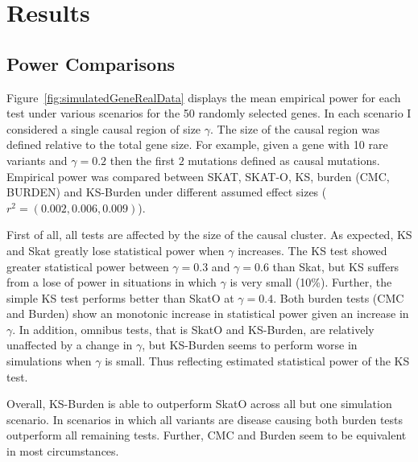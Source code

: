 \section{Results}
\label{sec:results}

\subsection{Power Comparisons}
\label{sub:power_comparisons}

Figure~\ref{fig:simulatedGeneRealData} displays the mean empirical power for each test under various scenarios for the 50 randomly selected genes.
In each scenario I considered a single causal region of size $\gamma$.
The size of the causal region was defined relative to the total gene size.
For example, given a gene with 10 rare variants and $\gamma=0.2$ then the first $2$ mutations defined as causal mutations.
Empirical power was compared between SKAT, SKAT-O, KS, burden (CMC, BURDEN) and KS-Burden under different assumed effect sizes ($r^2=(0.002, 0.006, 0.009)$).

First of all, all tests are affected by the size of the causal cluster.
As expected, KS and Skat greatly lose statistical power when $\gamma$ increases.
The KS test showed greater statistical power between $\gamma=0.3$ and $\gamma=0.6$ than Skat, but KS suffers from a lose of power in situations in which $\gamma$ is very small (10\%).
Further, the simple KS test performs better than SkatO at $\gamma=0.4$.
Both burden tests (CMC and Burden) show an monotonic increase in statistical power given an increase in $\gamma$.
In addition, omnibus tests, that is SkatO and KS-Burden, are relatively unaffected by a change in $\gamma$, but KS-Burden seems to perform worse in simulations when $\gamma$ is small.
Thus reflecting estimated statistical power of the KS test.

Overall, KS-Burden is able to outperform SkatO across all but one simulation scenario.
In scenarios in which all variants are disease causing both burden tests outperform all remaining tests.
Further, CMC and Burden seem to be equivalent in most circumstances.

